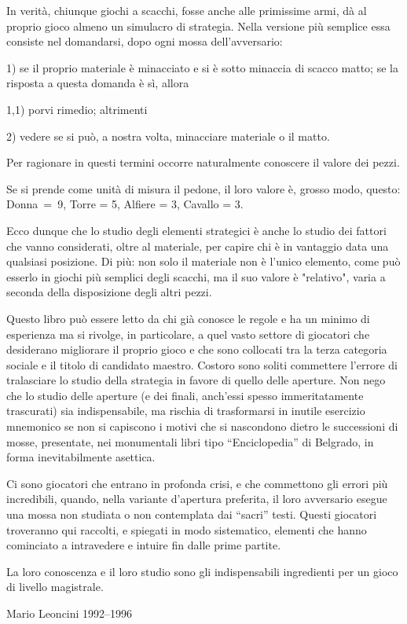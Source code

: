 In verità, chiunque giochi a scacchi, fosse anche alle primissime armi,
dà al proprio gioco almeno un simulacro di strategia. Nella versione più
semplice essa consiste nel domandarsi, dopo ogni mossa dell'avversario:

1) se il proprio materiale è minacciato e si è sotto minaccia di scacco
matto; se la risposta a questa domanda è sì, allora

1,1) porvi rimedio; altrimenti

2) vedere se si può, a nostra volta, minacciare materiale o il matto.

Per ragionare in questi termini occorre naturalmente conoscere il valore
dei pezzi.

Se si prende come unità di misura il pedone, il loro valore è, grosso
modo, questo: Donna~=~9, Torre = 5, Alfiere = 3, Cavallo = 3.

Ecco dunque che lo studio degli elementi strategici è anche lo studio
dei fattori che vanno considerati, oltre al materiale, per capire chi è
in vantaggio data una qualsiasi posizione. Di più: non solo il materiale
non è l'unico elemento, come può esserlo in giochi più semplici degli
scacchi, ma il suo valore è "relativo", varia a seconda della
disposizione degli altri pezzi.

Questo libro può essere letto da chi già conosce le regole e ha un
minimo di esperienza ma si rivolge, in particolare, a quel vasto settore
di giocatori che desiderano migliorare il proprio gioco e che sono
collocati tra la terza categoria sociale e il titolo di candidato
maestro. Costoro sono soliti commettere l'errore di tralasciare lo
studio della strategia in favore di quello delle aperture. Non nego che
lo studio delle aperture (e dei finali, anch'essi spesso immeritatamente
trascurati) sia indispensabile, ma rischia di trasformarsi in inutile
esercizio mnemonico se non si capiscono i motivi che si nascondono
dietro le successioni di mosse, presentate, nei monumentali libri tipo
``Enciclopedia'' di Belgrado, in forma inevitabilmente asettica.

Ci sono giocatori che entrano in profonda crisi, e che commettono gli
errori più incredibili, quando, nella variante d'apertura preferita, il
loro avversario esegue una mossa non studiata o non contemplata dai
``sacri'' testi. Questi giocatori troveranno qui raccolti, e spiegati in
modo sistematico, elementi che hanno cominciato a intravedere e intuire
fin dalle prime partite.

La loro conoscenza e il loro studio sono gli indispensabili ingredienti
per un gioco di livello magistrale.

Mario Leoncini 1992--1996
